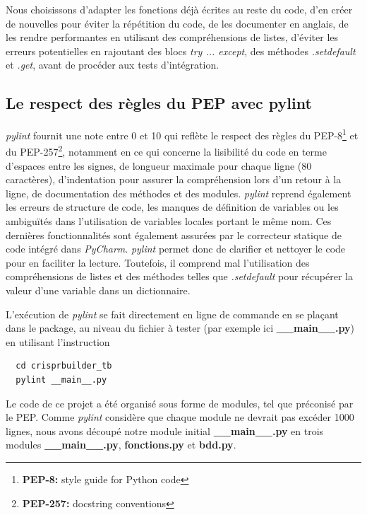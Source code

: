 \documentclass[twoside,a4paper,11pt,frenchb,openany]{report}
\begin{document}
Nous choisissons d'adapter les fonctions déjà écrites au reste du code, d'en créer de nouvelles pour éviter la répétition du code, de les documenter en anglais, de les rendre performantes en utilisant des compréhensions de listes, d'éviter les erreurs potentielles en rajoutant des blocs \textit{try ... except}, des méthodes \textit{.setdefault} et \textit{.get}, avant de procéder aux tests d'intégration.




\subsection{Le respect des règles du PEP avec pylint}

\textit{pylint} fournit une note entre 0 et 10 qui reflète le respect des règles du PEP-8\footnote{\textbf{PEP-8:} style guide for Python code} et du PEP-257\footnote{\textbf{PEP-257:} docstring conventions}, notamment en ce qui concerne la lisibilité du code en terme d'espaces entre les signes, de longueur maximale pour chaque ligne (80 caractères), d'indentation pour assurer la compréhension lors d'un retour à la ligne, de documentation des méthodes et des modules. \textit{pylint} reprend également les erreurs de structure de code, les manques de définition de variables ou les ambiguïtés dans l'utilisation de variables locales portant le même nom. Ces dernières fonctionnalités sont également assurées par le correcteur statique de code intégré dans \textit{PyCharm}. \textit{pylint} permet donc de clarifier et nettoyer le code pour en faciliter la lecture. Toutefois, il comprend mal l'utilisation des compréhensions de listes et des méthodes telles que \textit{.setdefault} pour récupérer la valeur d'une variable dans un dictionnaire. 

L'exécution de \textit{pylint} se fait directement en ligne de commande en se plaçant dans le package, au niveau du fichier à tester (par exemple ici \textbf{\_\_main\_\_.py}) en utilisant l'instruction

\begin{verbatim}  cd crisprbuilder_tb
  pylint __main__.py
\end{verbatim}

Le code de ce projet a été organisé sous forme de modules, tel que préconisé par le PEP. Comme \textit{pylint} considère que chaque module ne devrait pas excéder 1000 lignes, nous avons découpé notre module initial \textbf{\_\_main\_\_.py} en trois modules \textbf{\_\_main\_\_.py}, \textbf{fonctions.py} et \textbf{bdd.py}.
\end{document}
